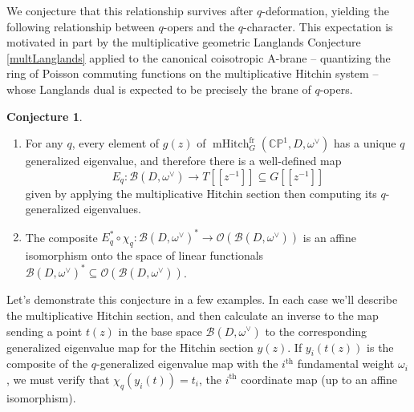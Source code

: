 \documentclass[11pt, oneside, reqno]{amsart}
\theoremstyle{definition} \newtheorem{definition}{Definition}[section]
\newtheorem{conjecture}[definition]{Conjecture}
\theoremstyle{definition} \newtheorem{remark}[definition]{Remark}
\theoremstyle{definition} \newtheorem{remarks}[definition]{Remarks}
\theoremstyle{definition} \newtheorem{question}[definition]{Question}
\theoremstyle{definition} \newtheorem*{note}{Note}
\theoremstyle{definition} \newtheorem{example}[definition]{Example}
\theoremstyle{definition} \newtheorem{examples}[definition]{Examples}
\newcommand{\bb}[1]{\mathbb{#1}}
\newcommand{\mc}[1]{\mathcal{#1}}
\newcommand{\OO}{\mathcal{O}}
\newcommand{\sub}{\subseteq}
\DeclareMathOperator{\mhitch}{mHitch}
\newcommand{\fr}{\mathrm{fr}}
\begin{document}
We conjecture that this relationship survives after $q$-deformation, yielding the following relationship between $q$-opers and the $q$-character.  This expectation is motivated in part by the multiplicative geometric Langlands Conjecture \ref{multLanglands} applied to the canonical coisotropic A-brane -- quantizing the ring of Poisson commuting functions on the multiplicative Hitchin system -- whose Langlands dual is expected to be precisely the brane of $q$-opers.
 
\begin{conjecture} \label{qchar_conjecture}
\begin{enumerate}
\item For any $q$, every element of $g(z)$ of $\mhitch^\fr_G(\bb{CP}^1, D, \omega^\vee)$ has a unique $q$ generalized eigenvalue, and therefore there is a well-defined map
\[E_q \colon \mc B(D,\omega^\vee) \to T[[z^{-1}]] \sub G[[z^{-1}]]\]
given by applying the multiplicative Hitchin section then computing its $q$-generalized eigenvalues.  

\item The composite $E_q^* \circ \chi_q \colon \mc B(D,\omega^\vee)^* \to \OO(\mc B(D,\omega^\vee))$ is an affine isomorphism onto the space of linear functionals $\mc B(D,\omega^\vee)^* \sub \OO(\mc B(D,\omega^\vee))$.
\end{enumerate}
\end{conjecture}

Let's demonstrate this conjecture in a few examples.  In each case we'll describe the multiplicative Hitchin section, and then calculate an inverse to the map sending a point $t(z)$ in the base space $\mc B(D,\omega^\vee)$ to the corresponding generalized eigenvalue map for the Hitchin section $y(z)$.  If $y_i(t(z))$ is the composite of the $q$-generalized eigenvalue map with the $i^\text{th}$ fundamental weight $\omega_i$, we must verify that $\chi_q(y_i(t)) = t_i$, the $i^\text{th}$ coordinate map (up to an affine isomorphism).
\end{document}
